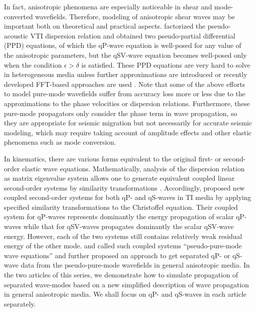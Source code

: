  In fact, anisotropic phenomena are especially noticeable in shear and mode-converted wavefields.
 Therefore, modeling of anisotropic shear waves
may be important both on theoretical and practical aspects. \cite{liu:2009}
 factorized the pseudo-acoustic VTI dispersion relation
 and obtained two pseudo-partial differential (PPD) equations, of which the qP-wave equation
is well-posed for any value of the anisotropic parameters, but the qSV-wave
 equation becomes well-posed only when the condition $\epsilon > \delta$ is satisfied. These PPD equations are very hard
 to solve in heterogeneous media unless further approximations are introduced \cite[]{liu:2009,
 chu:2011} or recently developed FFT-based approaches are used \cite[]{pestana:2011,song.fomel:2011,fomel:2013}.
Note that some of the above efforts to model pure-mode wavefields suffer from accuracy
 loss more or less due to the approximations to the phase velocities or dispersion relations. Furthermore,
these pure-mode propagators only consider the phase term in wave propagation, so they are appropriate
 for seismic migration but not necessarily for accurate seismic modeling, which may require taking account 
of amplitude effects and other elastic phenomena such as mode conversion.

In kinematics, there are various forms equivalent to the original first- or second-order elastic wave equations.
Mathematically, analysis of the dispersion relation as matrix eigenvalue system allows one to generate equivalent
coupled linear second-order systems by similarity transformations \cite[]{fowler:2010}.
Accordingly, \cite{kang.cheng:2011a} proposed new coupled second-order systems for both
qP- and qS-waves
 in TI media by applying specified similarity transformations to the Christoffel equation.
 Their coupled system for qP-waves represents dominantly
the energy propagation of scalar qP-waves while that for qSV-waves 
propagates dominantly the scalar qSV-wave
 energy. However, each of the two systems still contains
 relatively weak residual energy of the other mode. 
\cite{cheng.kang:2012} and \cite{kang.cheng:2012} 
 called such coupled systems ``pseudo-pure-mode wave equations'' and further proposed an approach
to get separated qP- or qS-wave data from the pseudo-pure-mode wavefields in general anisotropic media.
In the two articles of this series, we demonstrate how to simulate propagation of separated wave-modes based on 
a new simplified description of wave propagation in general anisotropic media.
We shall focus on qP- and qS-waves in each article separately.

